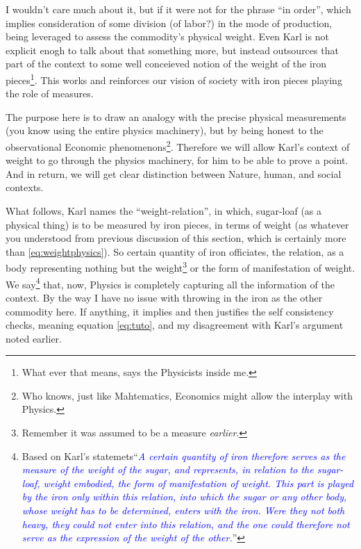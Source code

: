\documentclass[12pt]{extarticle}
\theoremstyle{definition}
\begin{document}
 I wouldn't care much about it, but if it were not for the phrase ``in order'', which implies consideration of some division (of labor?) in the mode of production, being leveraged to assess the commodity's physical weight.  Even Karl is not explicit enogh to talk about that something more, but instead outsources that part of the context to some well conceieved notion of the weight of the iron pieces\footnote{What ever that means, says the Physicists inside me.}.  This works and reinforces our vision of society with iron pieces playing the role of measures.

 The purpose here is to draw an analogy with the precise physical measurements (you know using the entire physics machinery), but by being honest to the observational Economic phenomenons\footnote{Who knows, just like Mahtematics, Economics might allow the interplay with Physics.}.  Therefore we will allow Karl's context of weight to go through the physics machinery, for him to be able to prove a point.  And in return, we will get clear distinction between Nature, human, and social contexts.

 What follows, Karl names the ``weight-relation'', in which, sugar-loaf (as a physical thing) is to be measured by iron pieces, in terms of weight (as whatever you understood from previous discussion of this section, which is certainly more than \ref{eq:weightphysics}).  So certain quantity of iron officiates, the relation, as a body representing nothing but the weight\footnote{Remember it was assumed to be a measure \emph{earlier}.} or the form of manifestation of weight.  We say\footnote{Based on Karl's statemets\newline ``\emph{\textcolor{blue}{A certain quantity of iron therefore serves as the measure of the weight of the sugar,
and represents, in relation to the sugar-loaf, weight embodied, the form of manifestation of
weight. This part is played by the iron only within this relation, into which the sugar or any other body, whose weight has to be determined, enters with the iron. Were they not both heavy, they
could not enter into this relation, and the one could therefore not serve as the expression of the
weight of the other.}}''} that, now, Physics is completely capturing all the information of the context.  By the way I have no issue with throwing in the iron as the other commodity here.  If anything, it implies and then justifies the self consistency checks, meaning equation \ref{eq:tuto}, and my disagreement with Karl's argument noted earlier.
\end{document}
